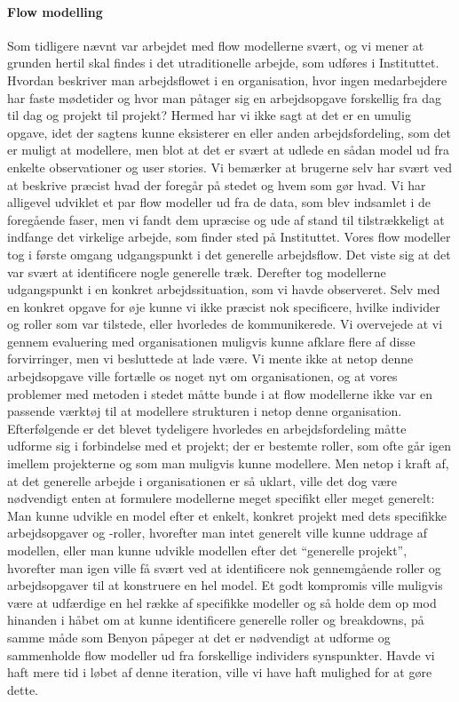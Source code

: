 \paragraph{Flow modelling}
Som tidligere nævnt var arbejdet med flow modellerne svært, og vi mener at grunden hertil skal findes i det utraditionelle arbejde, som udføres i Instituttet. Hvordan beskriver man arbejdsflowet i en organisation, hvor ingen medarbejdere har faste mødetider og hvor man påtager sig en arbejdsopgave forskellig fra dag til dag og projekt til projekt? Hermed har vi ikke sagt at det er en umulig opgave, idet der sagtens kunne eksisterer en eller anden arbejdsfordeling, som det er muligt at modellere, men blot at det er svært at udlede en sådan model ud fra enkelte observationer og user stories. Vi bemærker at brugerne selv har svært ved at beskrive præcist hvad der foregår på stedet og hvem som gør hvad.
Vi har alligevel udviklet et par flow modeller ud fra de data, som blev indsamlet i de foregående faser, men vi fandt dem upræcise og ude af stand til tilstrækkeligt at indfange det virkelige arbejde, som finder sted på Instituttet. 
Vores flow modeller tog i første omgang udgangspunkt i det generelle arbejdsflow. Det viste sig at det var svært at identificere nogle generelle træk. Derefter tog modellerne udgangspunkt i en konkret arbejdssituation, som vi havde observeret. Selv med en konkret opgave for øje kunne vi ikke præcist nok specificere, hvilke individer og roller som var tilstede, eller hvorledes de kommunikerede.
Vi overvejede at vi gennem evaluering med organisationen muligvis kunne afklare flere af disse forvirringer, men vi besluttede at lade være. Vi mente ikke at netop denne arbejdsopgave ville fortælle os noget nyt om organisationen, og at vores problemer med metoden i stedet måtte bunde i at flow modellerne ikke var en passende værktøj til at modellere strukturen i netop denne organisation.
Efterfølgende er det blevet tydeligere hvorledes en arbejdsfordeling måtte udforme sig i forbindelse med et projekt; der er bestemte roller, som ofte går igen imellem projekterne og som man muligvis kunne modellere. Men netop i kraft af, at det generelle arbejde i organisationen er så uklart, ville det dog være nødvendigt enten at formulere modellerne meget specifikt eller meget generelt: Man kunne udvikle en model efter et enkelt, konkret projekt med dets specifikke arbejdsopgaver og -roller, hvorefter man intet generelt ville kunne uddrage af modellen, eller man kunne udvikle modellen efter det “generelle projekt”, hvorefter man igen ville få svært ved at identificere nok gennemgående roller og arbejdsopgaver til at konstruere en hel model.
Et godt kompromis ville muligvis være at udfærdige en hel række af specifikke modeller og så holde dem op mod hinanden i håbet om at kunne identificere generelle roller og breakdowns, på samme måde som Benyon påpeger at det er nødvendigt at udforme og sammenholde flow modeller ud fra forskellige individers synspunkter. Havde vi haft mere tid i løbet af denne iteration, ville vi have haft mulighed for at gøre dette.


